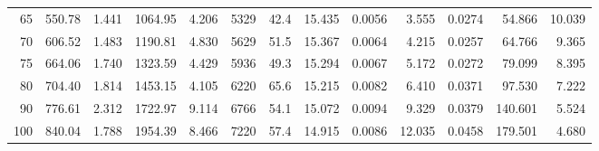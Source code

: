 \documentclass[10pt]{article}
\begin{document}
{\begin{tabular}{|r|rr|rr|rr|rr|rr|r|r|}
       65 &       550.78 &        1.441 &      1064.95 &        4.206 &         5329 &         42.4 &       15.435 &       0.0056 &        3.555 &       0.0274 &       54.866 &       10.039 \\
       70 &       606.52 &        1.483 &      1190.81 &        4.830 &         5629 &         51.5 &       15.367 &       0.0064 &        4.215 &       0.0257 &       64.766 &        9.365 \\
       75 &       664.06 &        1.740 &      1323.59 &        4.429 &         5936 &         49.3 &       15.294 &       0.0067 &        5.172 &       0.0272 &       79.099 &        8.395 \\
       80 &       704.40 &        1.814 &      1453.15 &        4.105 &         6220 &         65.6 &       15.215 &       0.0082 &        6.410 &       0.0371 &       97.530 &        7.222 \\
       90 &       776.61 &        2.312 &      1722.97 &        9.114 &         6766 &         54.1 &       15.072 &       0.0094 &        9.329 &       0.0379 &      140.601 &        5.524 \\
      100 &       840.04 &        1.788 &      1954.39 &        8.466 &         7220 &         57.4 &       14.915 &       0.0086 &       12.035 &       0.0458 &      179.501 &        4.680 \\
\hline
\end{tabular}
}







\pagebreak
\end{document}
